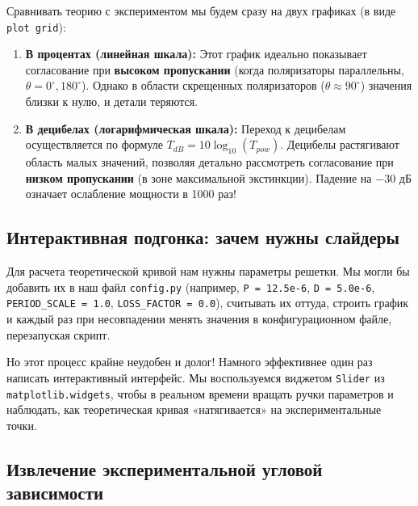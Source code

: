 Сравнивать теорию с экспериментом мы будем сразу на двух графиках (в виде \texttt{plot grid}):
\begin{enumerate}
    \item \textbf{В процентах (линейная шкала):} Этот график идеально показывает согласование при \textbf{высоком пропускании} (когда поляризаторы параллельны, $\theta = 0^\circ, 180^\circ$). Однако в области скрещенных поляризаторов ($\theta \approx 90^\circ$) значения близки к нулю, и детали теряются.
    \item \textbf{В децибелах (логарифмическая шкала):} Переход к децибелам осуществляется по формуле $T_{dB} = 10 \log_{10}(T_{pow})$. Децибелы растягивают область малых значений, позволяя детально рассмотреть согласование при \textbf{низком пропускании} (в зоне максимальной экстинкции). Падение на $-30$ дБ означает ослабление мощности в 1000 раз!
\end{enumerate}

\subsection{Интерактивная подгонка: зачем нужны слайдеры}

Для расчета теоретической кривой нам нужны параметры решетки. Мы могли бы добавить их в наш файл \texttt{config.py} (например, \texttt{P = 12.5e-6}, \texttt{D = 5.0e-6}, \texttt{PERIOD\_SCALE = 1.0}, \texttt{LOSS\_FACTOR = 0.0}), считывать их оттуда, строить график и каждый раз при несовпадении менять значения в конфигурационном файле, перезапуская скрипт.

Но этот процесс крайне неудобен и долог! Намного эффективнее один раз написать интерактивный интерфейс. Мы воспользуемся виджетом \texttt{Slider} из \texttt{matplotlib.widgets}, чтобы в реальном времени вращать ручки параметров и наблюдать, как теоретическая кривая «натягивается» на экспериментальные точки.

\subsection{Извлечение экспериментальной угловой зависимости}


